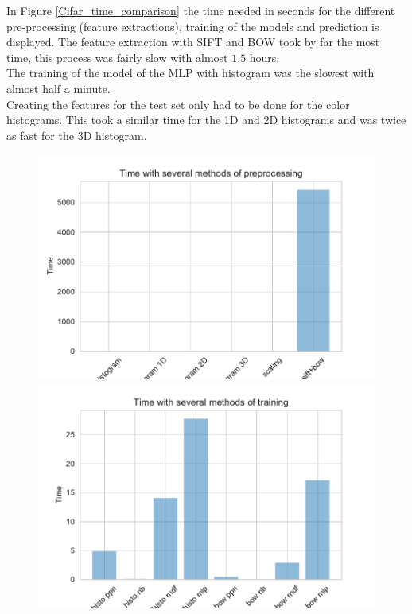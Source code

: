 \documentclass[11pt]{article}
\begin{document}
In Figure \ref{Cifar_time_comparison} the time needed in seconds for the different pre-processing (feature extractions), training of the models and prediction is displayed. The feature extraction with SIFT and BOW took by far the most time, this process was fairly slow with almost $1.5$ hours.\\
The training of the model of the MLP with histogram was the slowest with almost half a minute.\\
Creating the features for the test set only had to be done for the color histograms. This took a similar time for the 1D and 2D histograms and was twice as fast for the 3D histogram. 

\begin{figure}[H]
\begin{minipage}[c]{0.3\textwidth}
\includegraphics[width=1\linewidth]{figures/Cifar/time_prepro.pdf}
\end{minipage}
\begin{minipage}[c]{0.3\textwidth}
\includegraphics[width=1\linewidth]{figures/Cifar/time_training.pdf}

\end{minipage}
\end{figure}
\end{document}
